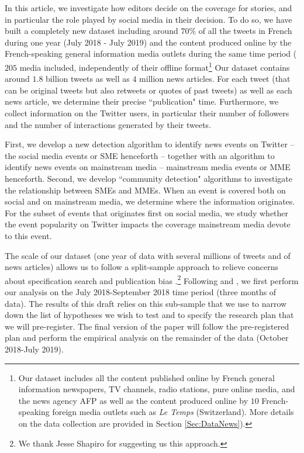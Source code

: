 In this article, we investigate how editors decide on the coverage for stories, and in particular the role played by social media in their decision. To do so, we have built a completely new dataset including around $70\%$ of all the tweets in French during one year (July 2018 - July 2019) and the content produced online by the French-speaking general information media outlets during the same time period ($205$ media included, independently of their offline format\footnote{Our dataset includes all the content published online by French general information newspapers, TV channels, radio stations, pure online media, and the news agency AFP as well as the content produced online by $10$ French-speaking foreign media outlets such as \textit{Le Temps} (Switzerland). More details on the data collection are provided in Section \ref{Sec:DataNews}).} Our dataset contains around $1.8$ billion tweets as well as $4$ million news articles. For each tweet (that can be original tweets but also retweets or quotes of past tweets) as well as each news article, we determine their precise ``publication" time. Furthermore, we collect information on the Twitter users, in particular their number of followers and the number of interactions generated by their tweets.

First, we develop a new detection algorithm to identify news events on Twitter -- the social media events or SME henceforth -- together with an algorithm to identify news events on mainstream media -- mainstream media events or MME henceforth. Second, we develop ``community detection" algorithms to investigate the relationship between SMEs and MMEs. When an event is covered both on social and on mainstream media, we determine where the information originates. For the subset of events that originates first on social media, we study whether the event popularity on Twitter impacts the coverage mainstream media devote to this event.

The scale of our dataset (one year of data with several millions of tweets and of news articles) allows us to follow a split-sample approach to relieve concerns about specification search and publication bias \citep{Leamer1978,Leamer1983,Glaeser2006_incentives}.\footnote{We thank Jesse Shapiro for suggesting us this approach.} Following \citet{FafchampsLabonne2016,FafchampsLabonne2017} and \citet{AndersonMagruder2017}, we first perform our analysis on the July 2018-September 2018 time period (three months of data). The results of this draft relies on this sub-sample that we use to narrow down the list of hypotheses we wish to test and to specify the research plan that we will pre-register. The final version of the paper will follow the pre-registered plan and perform the empirical analysis on the remainder of the data (October 2018-July 2019).

